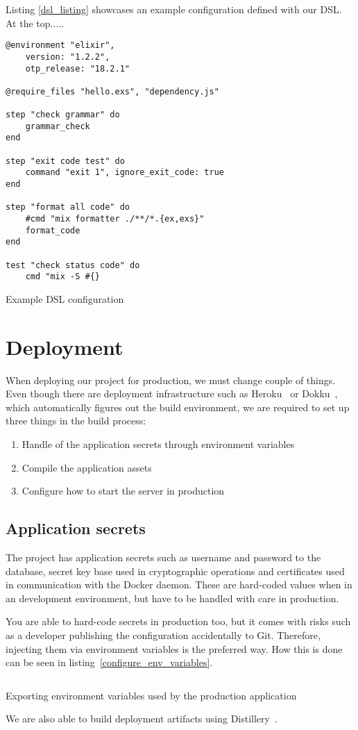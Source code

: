 Listing \ref{dsl_listing} showcases an example configuration defined with our DSL. At the top.....

\begin{listing}
\begin{verbatim}
@environment "elixir",
	version: "1.2.2",
	otp_release: "18.2.1"

@require_files "hello.exs", "dependency.js"

step "check grammar" do
	grammar_check
end

step "exit code test" do
	command "exit 1", ignore_exit_code: true
end

step "format all code" do
	#cmd "mix formatter ./**/*.{ex,exs}"
	format_code
end

test "check status code" do
	cmd "mix -S #{}
\end{verbatim}
\caption{Example DSL configuration}
\label{dsl_listing}
\end{listing}

\section{Deployment}

When deploying our project for production, we must change couple of things. Even though there are deployment infrastructure such as Heroku~\cite{CloudHeroku} or Dokku~\cite{DokkuSeen}, which automatically figures out the build environment, we are required to set up three things in the build process:

\begin{enumerate}
\item Handle of the application secrets through environment variables
\item Compile the application assets
\item Configure how to start the server in production
\end{enumerate}

\subsection{Application secrets}

The project has application secrets such as username and password to the database, secret key base used in cryptographic operations and certificates used in communication with the Docker daemon. These are hard-coded values when in an development environment, but have to be handled with care in production.

You are able to hard-code secrets in production too, but it comes with risks such as a developer publishing the configuration accidentally to Git. Therefore, injecting them via environment variables is the preferred way. How this is done can be seen in listing~\ref{configure_env_variables}.

\begin{listing}
\inputminted{bash}{code/env.sh}
\caption{Exporting environment variables used by the production application}
\label{configure_env_variables}
\end{listing}

We are also able to build deployment artifacts using Distillery~\cite{HomeDocumentation}.

